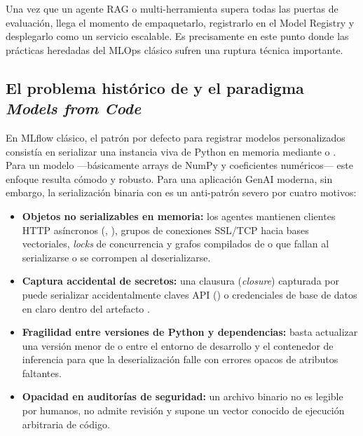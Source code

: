 Una vez que un agente RAG o multi-herramienta supera todas las puertas de evaluación, llega el momento de empaquetarlo, registrarlo en el Model Registry y desplegarlo como un servicio escalable. Es precisamente en este punto donde las prácticas heredadas del MLOps clásico sufren una ruptura técnica importante.

\subsection{El problema histórico de \texorpdfstring{}{pickle} y el paradigma \textit{Models from Code}}\label{subsec:models-from-code}

En MLflow clásico, el patrón por defecto para registrar modelos personalizados consistía en serializar una instancia viva de Python en memoria mediante  o . Para un modelo  ---básicamente arrays de NumPy y coeficientes numéricos--- este enfoque resulta cómodo y robusto. Para una aplicación GenAI moderna, sin embargo, la serialización binaria con  es un anti-patrón severo por cuatro motivos:

\begin{itemize}
  \item \textbf{Objetos no serializables en memoria:} los agentes mantienen clientes HTTP asíncronos (, ), grupos de conexiones SSL/TCP hacia bases vectoriales, \textit{locks} de concurrencia y grafos compilados de  o  que fallan al serializarse o se corrompen al deserializarse.
  \item \textbf{Captura accidental de secretos:} una clausura (\textit{closure}) capturada por  puede serializar accidentalmente claves API () o credenciales de base de datos en claro dentro del artefacto .
  \item \textbf{Fragilidad entre versiones de Python y dependencias:} basta actualizar una versión menor de  o  entre el entorno de desarrollo y el contenedor de inferencia para que la deserialización falle con errores opacos de atributos faltantes.
  \item \textbf{Opacidad en auditorías de seguridad:} un archivo binario  no es legible por humanos, no admite revisión  y supone un vector conocido de ejecución arbitraria de código.
\end{itemize}

